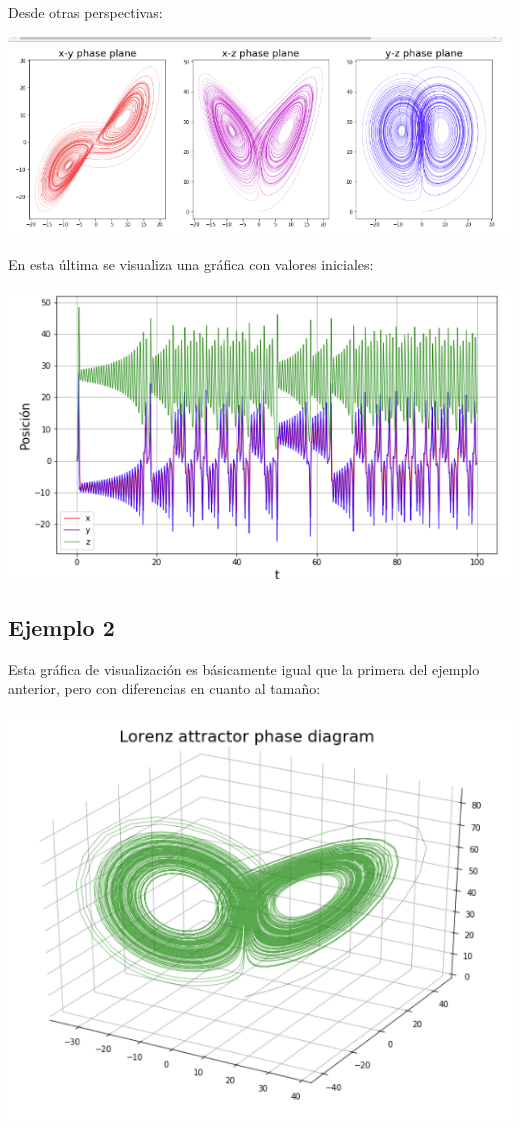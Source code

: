 \documentclass{article}
\begin{document}
Desde otras perspectivas:
\begin{center}
\includegraphics[scale=0.5]{Eval2.png}
\end{center}
En esta última se visualiza una gráfica con valores iniciales:
\begin{center}
\includegraphics[scale=0.4]{Eval3.png}
\end{center}

\subsection{Ejemplo 2}
Esta gráfica de visualización es básicamente igual que la primera del ejemplo anterior, pero con diferencias en cuanto al tamaño:
\begin{center}
\includegraphics[scale=0.4]{Eval4.png}
\end{center}
\end{document}

